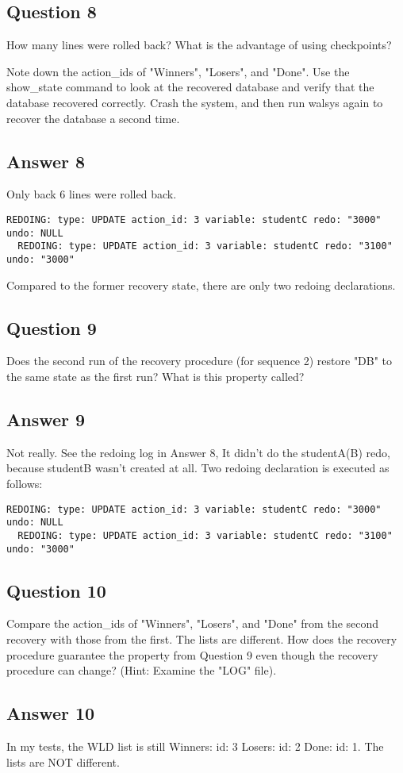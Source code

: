 \documentclass[12pt]{article}
\begin{document}
\subsection*{Question 8} How many lines were rolled back? What is the advantage of using checkpoints?

Note down the action\_ids of "Winners", "Losers", and "Done". Use the show\_state command to look at the recovered database and verify that the database recovered correctly. Crash the system, and then run wal\-sys again to recover the database a second time.

\subsection*{Answer 8} Only back 6 lines were rolled back.
\begin{lstlisting}[numberstyle=\tiny\monaco,
        basicstyle=\small\monaco]
  REDOING: type: UPDATE action_id: 3 variable: studentC redo: "3000" undo: NULL
  REDOING: type: UPDATE action_id: 3 variable: studentC redo: "3100" undo: "3000"
\end{lstlisting}

Compared to the former recovery state, there are only two redoing declarations. 
\subsection*{Question 9} Does the second run of the recovery procedure (for sequence 2) restore "DB" to the same state as the first run? What is this property called?

\subsection*{Answer 9} Not really. See the redoing log in Answer 8, It didn't do the studentA(B) redo, because studentB wasn't created at all. Two redoing declaration is executed as follows: 
\begin{lstlisting}[numberstyle=\tiny\monaco,
        basicstyle=\small\monaco]
  REDOING: type: UPDATE action_id: 3 variable: studentC redo: "3000" undo: NULL
  REDOING: type: UPDATE action_id: 3 variable: studentC redo: "3100" undo: "3000"
\end{lstlisting}

\subsection*{Question 10} Compare the action\_ids of "Winners", "Losers", and "Done" from the second recovery with those from the first. The lists are different. How does the recovery procedure guarantee the property from Question 9 even though the recovery procedure can change? (Hint: Examine the "LOG" file).

\subsection*{Answer 10} In my tests, the WLD list is still Winners: id: 3  Losers: id: 2  Done: id: 1. The lists are NOT different.
\end{document}

